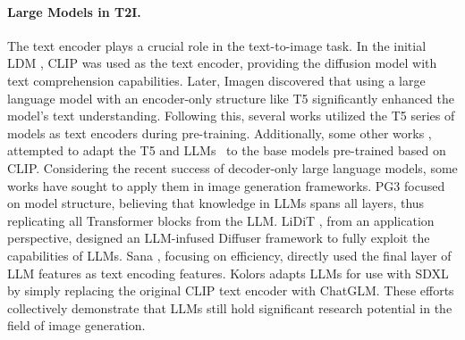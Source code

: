 \paragraph{Large Models in T2I.} 




The text encoder plays a crucial role in the text-to-image task. In the initial LDM \cite{rombach2022high}, CLIP \cite{radford2021learning} was used as the text encoder, providing the diffusion model with text comprehension capabilities. Later, Imagen \cite{saharia2022photorealistic} discovered that using a large language model with an encoder-only structure like T5 \cite{raffel2020exploring} significantly enhanced the model's text understanding. Following this, several works \cite{chen2023pixart, chen2024pixart, sun2024autoregressive, betker2023improving, esser2024scaling} utilized the T5 series of models as text encoders during pre-training. Additionally, some other works \cite{liu2024llm4genleveragingsemanticrepresentation, hu2024ella, zhao2024bridging, tan2024empirical}, attempted to adapt the T5 and LLMs~\cite{dubey2024llama} to the base models pre-trained based on CLIP. Considering the recent success of decoder-only large language models, some works have sought to apply them in image generation frameworks. PG3 \cite{liu2024playground} focused on model structure, believing that knowledge in LLMs spans all layers, thus replicating all Transformer blocks from the LLM. LiDiT \cite{ma2024exploring}, from an application perspective, designed an LLM-infused Diffuser framework to fully exploit the capabilities of LLMs. Sana \cite{xie2024sana}, focusing on efficiency, directly used the final layer of LLM features as text encoding features. Kolors \cite{kolors} adapts LLMs for use with SDXL by simply replacing the original CLIP text encoder with ChatGLM. These efforts collectively demonstrate that LLMs still hold significant research potential in the field of image generation.



